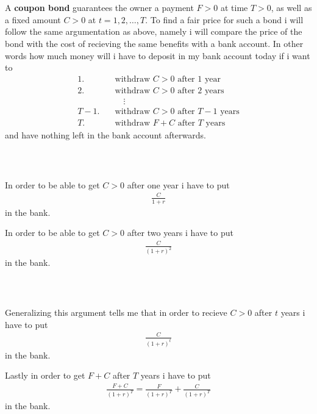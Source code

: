 \documentclass{beamer}
\numberwithin{equation}{section}
\begin{document}
\begin{frame}\frametitle{{\normalsize \secname} \\ {\large \subsecname}}
    A \textbf{coupon bond} guarantees the owner a payment $F > 0$ at time $T > 0$, as well as a fixed amount $C > 0$ at $t = 1,2,\ldots,T$.
    To find a fair price for such a bond i will follow the same argumentation as above, namely i will compare the price of the bond with the cost of recieving the same benefits with a bank account.
    In other words how much money will i have to deposit in my bank account today if i want to
    \begin{align}
        \text{1.} \quad &\text{withdraw $C > 0$ after 1 year} \\
        \text{2.} \quad &\text{withdraw $C > 0$ after 2 years} \\
        &\quad \vdots \nonumber \\
        \text{$T-1$.} \quad &\text{withdraw $C > 0$ after $T-1$ years} \\
        \text{$T$.} \quad &\text{withdraw $F + C$ after $T$ years}
    \end{align}
    and have nothing left in the bank account afterwards.
\end{frame}

\begin{frame}\frametitle{{\normalsize \secname} \\ {\large \subsecname}}
    In order to be able to get $C > 0$ after one year i have to put
    \begin{align}
        \frac{C}{1+r}
    \end{align}
    in the bank.
    \pause

    In order to be able to get $C > 0$ after two years i have to put
    \begin{align}
        \frac{C}{(1+r)^2}
    \end{align}
    in the bank.
\end{frame}

\begin{frame}\frametitle{{\normalsize \secname} \\ {\large \subsecname}}
    Generalizing this argument tells me that in order to recieve $C > 0$ after $t$ years i have to put
    \begin{align}
        \frac{C}{(1+r)^t}
    \end{align}
    in the bank.
    \pause

    Lastly in order to get $F + C$ after $T$ years i have to put
    \begin{align}
        \frac{F + C}{(1+r)^T} = \frac{F}{(1+r)^T} + \frac{C}{(1+r)^T}
    \end{align}
    in the bank.
\end{frame}
\end{document}
